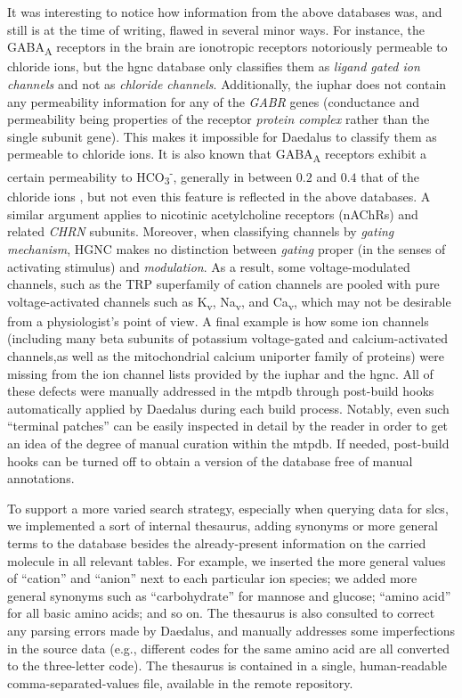 It was interesting to notice how information from the above databases was, and still is at the time of writing, flawed in several minor ways.
For instance, the GABA\textsubscript{A} receptors in the brain are ionotropic receptors notoriously permeable to chloride ions, but the \gls{hgnc} database only classifies them as \textit{ligand gated ion channels} and not as \textit{chloride channels}.
Additionally, the \gls{iuphar} does not contain any permeability information for any of the \textit{GABR\textasteriskcentered{}} genes (conductance and permeability being properties of the receptor \textit{protein complex} rather than the single subunit gene).
This makes it impossible for Daedalus to classify them as permeable to chloride ions.
It is also known that GABA\textsubscript{A} receptors exhibit a certain permeability to HCO\textsubscript{3}\textsuperscript{-}, generally in between $0.2$ and $0.4$ that of the chloride ions \cite{goetzGABAAReceptors2007}, but not even this feature is reflected in the above databases.
A similar argument applies to nicotinic acetylcholine receptors (nAChRs) and related \textit{CHRN\textasteriskcentered{}} subunits.
Moreover, when classifying channels by \textit{gating mechanism}, HGNC makes no distinction between \textit{gating} proper (in the senses of activating stimulus) and \textit{modulation}.
As a result, some voltage-modulated channels, such as the TRP superfamily of cation channels are pooled with pure voltage-activated channels such as K\textsubscript{v}, Na\textsubscript{v}, and Ca\textsubscript{v}, which may not be desirable from a physiologist's point of view.
A final example is how some ion channels (including many beta subunits of potassium voltage-gated and calcium-activated channels,as well as the mitochondrial calcium uniporter family of proteins) were missing from the ion channel lists provided by the \gls{iuphar} and the \gls{hgnc}.
All of these defects were manually addressed in the \gls{mtpdb} through post-build hooks automatically applied by Daedalus during each build process.
Notably, even such ``terminal patches'' can be easily inspected in detail by the reader in order to get an idea of the degree of manual curation within the \gls{mtpdb}.
If needed, post-build hooks can be turned off to obtain a version of the database free of manual annotations.

To support a more varied search strategy, especially when querying data for \glspl{slc}, we implemented a sort of internal thesaurus, adding synonyms or more general terms to the database besides the already-present information on the carried molecule in all relevant tables.
For example, we inserted the more general values of ``cation'' and ``anion'' next to each particular ion species;
we added more general synonyms such as ``carbohydrate'' for mannose and glucose;
``amino acid'' for all basic amino acids; and so on.
The thesaurus is also consulted to correct any parsing errors made by Daedalus, and manually addresses some imperfections in the source data (e.g., different codes for the same amino acid are all converted to the three-letter code).
The thesaurus is contained in a single, human-readable comma-separated-values file, available in the remote repository.

